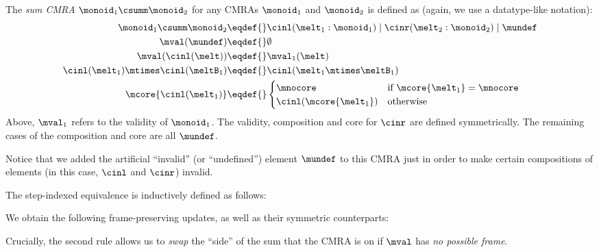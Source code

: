 The \emph{sum CMRA} $\monoid_1 \csumm \monoid_2$ for any CMRAs $\monoid_1$ and $\monoid_2$ is defined as (again, we use a datatype-like notation):
\begin{align*}
  \monoid_1 \csumm \monoid_2 \eqdef{}& \cinl(\melt_1:\monoid_1) \mid \cinr(\melt_2:\monoid_2) \mid \mundef \\
  \mval(\mundef) \eqdef{}& \emptyset \\
  \mval(\cinl(\melt)) \eqdef{}& \mval_1(\melt)  \\
  \cinl(\melt_1) \mtimes \cinl(\meltB_1) \eqdef{}& \cinl(\melt_1 \mtimes \meltB_1)  \\
  \mcore{\cinl(\melt_1)} \eqdef{}& \begin{cases}\mnocore & \text{if $\mcore{\melt_1} = \mnocore$} \\ \cinl({\mcore{\melt_1}}) & \text{otherwise} \end{cases}
\end{align*}
Above, $\mval_1$ refers to the validity of $\monoid_1$.
The validity, composition and core for $\cinr$ are defined symmetrically.
The remaining cases of the composition and core are all $\mundef$.

Notice that we added the artificial ``invalid'' (or ``undefined'') element $\mundef$ to this CMRA just in order to make certain compositions of elements (in this case, $\cinl$ and $\cinr$) invalid.

The step-indexed equivalence is inductively defined as follows:
\begin{mathpar}


\end{mathpar}


We obtain the following frame-preserving updates, as well as their symmetric counterparts:
Crucially, the second rule allows us to \emph{swap} the ``side'' of the sum that the CMRA is on if $\mval$ has \emph{no possible frame}.

